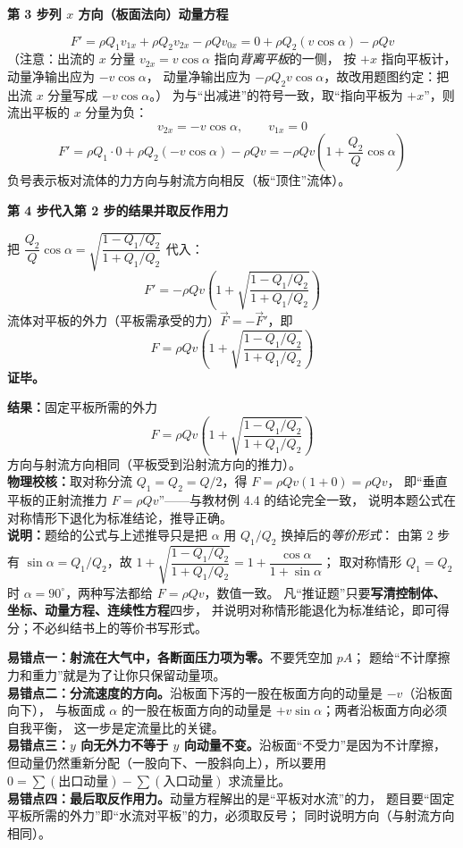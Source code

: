 \begin{jie}
\textbf{第 3 步\quad 列 $x$ 方向（板面法向）动量方程}

\[ F'=\rho Q_1v_{1x}+\rho Q_2v_{2x}-\rho Qv_{0x}
   =0+\rho Q_2\left(v\cos\alpha\right)-\rho Qv \]
（注意：出流的 $x$ 分量 $v_{2x}=v\cos\alpha$ 指向\emph{背离平板}的一侧，
按 $+x$ 指向平板计，动量净输出应为 $-v\cos\alpha$，
动量净输出应为 $-\rho Q_2v\cos\alpha$，故改用题图约定：把出流 $x$ 分量写成 $-v\cos\alpha$。）
为与“出减进”的符号一致，取“指向平板为 $+x$”，则流出平板的 $x$ 分量为负：
\[ v_{2x}=-v\cos\alpha,\qquad v_{1x}=0 \]
\[ F'=\rho Q_1\cdot0+\rho Q_2(-v\cos\alpha)-\rho Qv
   =-\rho Qv\left(1+\frac{Q_2}{Q}\cos\alpha\right) \]
负号表示板对流体的力方向与射流方向相反（板“顶住”流体）。

\textbf{第 4 步\quad 代入第 2 步的结果并取反作用力}

把 $\dfrac{Q_2}{Q}\cos\alpha=\sqrt{\dfrac{1-Q_1/Q_2}{1+Q_1/Q_2}}$ 代入：
\[ F'=-\rho Qv\left(1+\sqrt{\frac{1-Q_1/Q_2}{1+Q_1/Q_2}}\right) \]
流体对平板的外力（平板需承受的力）$\vec F=-\vec F'$，即
\[ F=\rho Qv\left(1+\sqrt{\frac{1-Q_1/Q_2}{1+Q_1/Q_2}}\right) \]
\textbf{证毕。}

\textbf{结果：}固定平板所需的外力
\[ F=\rho Qv\left(1+\sqrt{\frac{1-Q_1/Q_2}{1+Q_1/Q_2}}\right) \]
方向与射流方向相同（平板受到沿射流方向的推力）。\\
\textbf{物理校核：}取对称分流 $Q_1=Q_2=Q/2$，得 $F=\rho Qv(1+0)=\rho Qv$，
即“垂直平板的正射流推力 $F=\rho Qv$”——与教材例 4.4 的结论完全一致，
说明本题公式在对称情形下退化为标准结论，推导正确。\\
\textbf{说明：}题给的公式与上述推导只是把 $\alpha$ 用 $Q_1/Q_2$ 换掉后的\emph{等价形式}：
由第 2 步有 $\sin\alpha=Q_1/Q_2$，故 $1+\sqrt{\dfrac{1-Q_1/Q_2}{1+Q_1/Q_2}}
=1+\dfrac{\cos\alpha}{1+\sin\alpha}$；
取对称情形 $Q_1=Q_2$ 时 $\alpha=90^\circ$，两种写法都给 $F=\rho Qv$，数值一致。
凡“推证题”只要\textbf{写清控制体、坐标、动量方程、连续性方程}四步，
并说明对称情形能退化为标准结论，即可得分；不必纠结书上的等价书写形式。
\end{jie}

\begin{yicuo}
\textbf{易错点一：射流在大气中，各断面压力项为零。}不要凭空加 $pA$；
题给“不计摩擦力和重力”就是为了让你只保留动量项。\\
\textbf{易错点二：分流速度的方向。}沿板面下泻的一股在板面方向的动量是 $-v$（沿板面向下），
与板面成 $\alpha$ 的一股在板面方向的动量是 $+v\sin\alpha$；两者沿板面方向必须自我平衡，
这一步是定流量比的关键。\\
\textbf{易错点三：$y$ 向无外力不等于 $y$ 向动量不变。}沿板面“不受力”是因为不计摩擦，
但动量仍然重新分配（一股向下、一股斜向上），所以要用 $0=\sum(\text{出口动量})-\sum(\text{入口动量})$ 求流量比。\\
\textbf{易错点四：最后取反作用力。}动量方程解出的是“平板对水流”的力，
题目要“固定平板所需的外力”即“水流对平板”的力，必须取反号；
同时说明方向（与射流方向相同）。
\end{yicuo}

